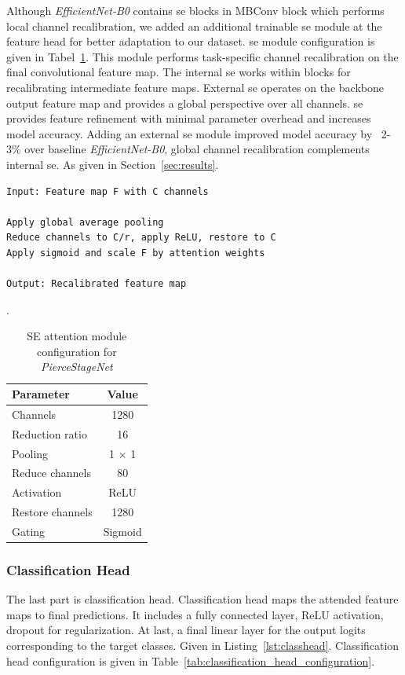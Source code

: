 \documentclass[conference]{IEEEtran}
\begin{document}
Although \textit{EfficientNet-B0} contains \ac{se} blocks in MBConv block which performs local channel recalibration, we added an additional trainable \ac{se} module at the feature head for better adaptation to our dataset. \ac{se} module configuration is given in Tabel~\ref{tab:se_configuration}. This module performs task-specific channel recalibration on the final convolutional feature map. The internal \ac{se} works within blocks for recalibrating intermediate feature maps. External \ac{se} operates on the backbone output feature map and provides a global perspective over all channels. \ac{se} provides feature refinement with minimal parameter overhead and increases model accuracy. Adding an external \ac{se} module improved model accuracy by ~2-3\% over baseline \textit{EfficientNet-B0}, global channel recalibration complements internal \ac{se}. As given in Section~\ref{sec:results}.

\begin{lstlisting}[style=ieeelisting, frame=none,
caption={\ac{se} Module},
label={lst:semodule}, basicstyle=\ttfamily\footnotesize]
Input: Feature map F with C channels

Apply global average pooling
Reduce channels to C/r, apply ReLU, restore to C
Apply sigmoid and scale F by attention weights

Output: Recalibrated feature map
\end{lstlisting}

\begin{table}[h!]
    \caption{SE attention module configuration for \textit{PierceStageNet}}.
    \centering
    \begin{tabular}{lc}
        \toprule
        \textbf{Parameter} & \textbf{Value} \\
        \midrule
        Channels           & 1280 \\
        Reduction ratio    & 16 \\
        Pooling            & 1 × 1 \\
        Reduce channels    & 80 \\
        Activation         & ReLU \\
        Restore channels   & 1280 \\
        Gating             & Sigmoid \\
        \bottomrule
    \end{tabular}
    \label{tab:se_configuration}
\end{table}

\subsubsection{Classification Head}
The last part is classification head. Classification head maps the attended feature maps to final predictions. It includes a fully connected layer, ReLU activation, dropout for regularization. At last, a final linear layer for the output logits corresponding to the target classes. Given in Listing~\ref{lst:classhead}. Classification head configuration is given in Table~\ref{tab:classification_head_configuration}.
\end{document}
